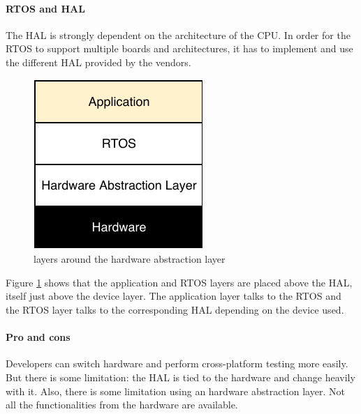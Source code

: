 \paragraph{RTOS and HAL}
The HAL is strongly dependent on the architecture of the CPU.
In order for the RTOS to support multiple boards and architectures, it has to implement and use the different HAL provided by the vendors.

\begin{figure}[!h]
  \centering
  \includegraphics[scale=1]{assets/hal-layers.pdf}
  \caption{\label{fig:hal-layer}layers around the hardware abstraction layer}
\end{figure}

Figure \ref{fig:hal-layer} shows that the application and RTOS layers are placed above the HAL, itself just above the device layer.
The application layer talks to the RTOS and the RTOS layer talks to the corresponding HAL depending on the device used.

\paragraph{Pro and cons}
Developers can switch hardware and perform cross-platform testing more easily.
But there is some limitation: the HAL is tied to the hardware and change heavily with it.
Also, there is some limitation using an hardware abstraction layer.
Not all the functionalities from the hardware are available.